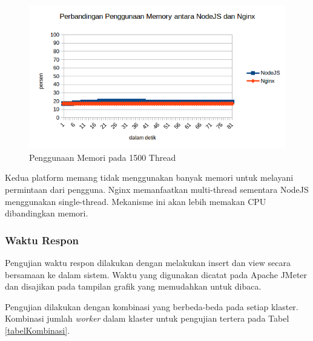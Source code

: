 \documentclass{ta-its}
\begin{document}
					\begin{figure}[h] %
						\centering
						\includegraphics[width=\linewidth]{contoh_img/perbandingan-memori}
						\caption{Penggunaan Memori pada 1500 Thread}
						\label{gambarMemoryUsage}
					\end{figure}
					
					Kedua platform memang tidak menggunakan banyak memori untuk melayani permintaan dari pengguna. Nginx memanfaatkan multi-thread sementara NodeJS menggunakan single-thread. Mekanisme ini akan lebih memakan CPU dibandingkan memori.
				
				\subsubsection{Waktu Respon}
					Pengujian waktu respon dilakukan dengan melakukan insert dan view secara bersamaan ke dalam sistem. Waktu yang digunakan dicatat pada Apache JMeter dan disajikan pada tampilan grafik yang memudahkan untuk dibaca. 
					
					Pengujian dilakukan dengan kombinasi yang berbeda-beda pada setiap klaster. Kombinasi jumlah \textit{worker} dalam klaster untuk pengujian tertera pada Tabel \ref{tabelKombinasi}.
					
\end{document}
